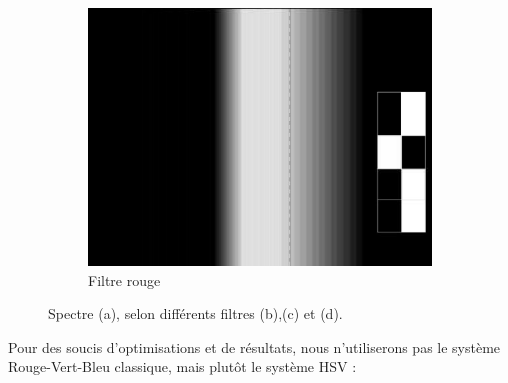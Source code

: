 \begin{itemize}
\begin{figure}[H]
					    \begin{subfigure}[h]{0.3\textwidth}
					        \includegraphics[width=\textwidth]{Graphics/opencvR.jpg}
					        \caption{Filtre rouge}
					    \end{subfigure}

					    \caption{Spectre (a), selon différents filtres (b),(c) et (d).}
					\end{figure}

					Pour des soucis d'optimisations et de résultats, nous n'utiliserons pas le système Rouge-Vert-Bleu classique, mais plutôt le système \label{HSV}HSV :


\end{itemize}
